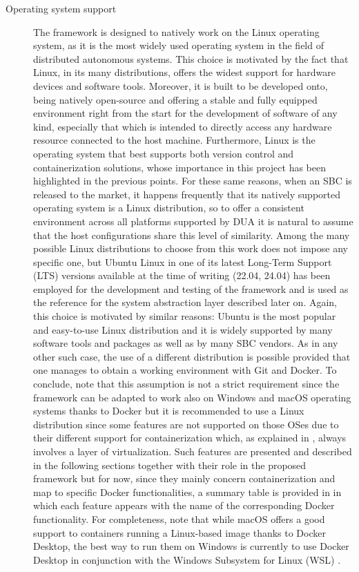\begin{description}
  \item[Operating system support] The framework is designed to natively work on the Linux operating system, as it is the most widely used operating system in the field of distributed autonomous systems. This choice is motivated by the fact that Linux, in its many distributions, offers the widest support for hardware devices and software tools. Moreover, it is built to be developed onto, being natively open-source and offering a stable and fully equipped environment right from the start for the development of software of any kind, especially that which is intended to directly access any hardware resource connected to the host machine. Furthermore, Linux is the operating system that best supports both version control and containerization solutions, whose importance in this project has been highlighted in the previous points. For these same reasons, when an SBC is released to the market, it happens frequently that its natively supported operating system is a Linux distribution, so to offer a consistent environment across all platforms supported by DUA it is natural to assume that the host configurations share this level of similarity. Among the many possible Linux distributions to choose from this work does not impose any specific one, but Ubuntu Linux in one of its latest Long-Term Support (LTS) versions available at the time of writing (22.04, 24.04) has been employed for the development and testing of the framework and is used as the reference for the system abstraction layer described later on. Again, this choice is motivated by similar reasons: Ubuntu is the most popular and easy-to-use Linux distribution and it is widely supported by many software tools and packages as well as by many SBC vendors. As in any other such case, the use of a different distribution is possible provided that one manages to obtain a working environment with Git and Docker. To conclude, note that this assumption is not a strict requirement since the framework can be adapted to work also on Windows and macOS operating systems thanks to Docker but it is recommended to use a Linux distribution since some features are not supported on those OSes due to their different support for containerization which, as explained in , always involves a layer of virtualization. Such features are presented and described in the following sections together with their role in the proposed framework but for now, since they mainly concern containerization and map to specific Docker functionalities, a summary table is provided in  in which each feature appears with the name of the corresponding Docker functionality. For completeness, note that while macOS offers a good support to containers running a Linux-based image thanks to Docker Desktop, the best way to run them on Windows is currently to use Docker Desktop in conjunction with the Windows Subsystem for Linux (WSL) \cite{microsoft_windows_nodate}.
\end{description}

